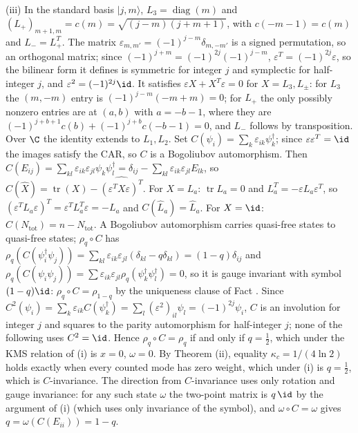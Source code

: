 (iii) In the standard basis $|j, m\rangle$, $L_{3} = \operatorname{diag}(m)$ and $(L_{+})_{m+1,m} = c(m) = \sqrt{(j - m)(j + m + 1)}$, with $c(-m-1) = c(m)$ and $L_{-} = L_{+}^{T}$. The matrix $\varepsilon_{m,m'} = (-1)^{j-m}\delta_{m,-m'}$ is a signed permutation, so an orthogonal matrix; since $(-1)^{j+m} = (-1)^{2j}(-1)^{j-m}$, $\varepsilon^{T} = (-1)^{2j}\varepsilon$, so the bilinear form it defines is symmetric for integer $j$ and symplectic for half-integer $j$, and $\varepsilon^{2} = (-1)^{2j}\id$. It satisfies $\varepsilon X + X^{T}\varepsilon = 0$ for $X = L_{3}, L_{\pm}$: for $L_{3}$ the $(m, -m)$ entry is $(-1)^{j-m}(-m + m) = 0$; for $L_{+}$ the only possibly nonzero entries are at $(a, b)$ with $a = -b - 1$, where they are $(-1)^{j+b+1}c(b) + (-1)^{j+b}c(-b-1) = 0$, and $L_{-}$ follows by transposition. Over $\C$ the identity extends to $L_{1}, L_{2}$. Set $C(\psi_{i}) = \sum_{k}\varepsilon_{ik}\psi_{k}^{\dagger}$; since $\varepsilon\varepsilon^{T} = \id$ the images satisfy the CAR, so $C$ is a Bogoliubov automorphism. Then $C(E_{ij}) = \sum_{kl}\varepsilon_{ik}\varepsilon_{jl}\psi_{k}\psi_{l}^{\dagger} = \delta_{ij} - \sum_{kl}\varepsilon_{ik}\varepsilon_{jl}E_{lk}$, so $C(\hat{X}) = \operatorname{tr}(X) - \widehat{(\varepsilon^{T}X\varepsilon)^{T}}$. For $X = L_{a}$: $\operatorname{tr}L_{a} = 0$ and $L_{a}^{T} = -\varepsilon L_{a}\varepsilon^{T}$, so $(\varepsilon^{T}L_{a}\varepsilon)^{T} = \varepsilon^{T}L_{a}^{T}\varepsilon = -L_{a}$ and $C(\hat{L}_{a}) = \hat{L}_{a}$. For $X = \id$: $C(N_{\mathrm{tot}}) = n - N_{\mathrm{tot}}$. A Bogoliubov automorphism carries quasi-free states to quasi-free states; $\rho_{q}\circ C$ has $\rho_{q}(C(\psi_{i}^{\dagger}\psi_{j})) = \sum_{kl}\varepsilon_{ik}\varepsilon_{jl}(\delta_{kl} - q\delta_{kl}) = (1 - q)\delta_{ij}$ and $\rho_{q}(C(\psi_{i}\psi_{j})) = \sum\varepsilon_{ik}\varepsilon_{jl}\rho_{q}(\psi_{k}^{\dagger}\psi_{l}^{\dagger}) = 0$, so it is gauge invariant with symbol $(1 - q)\id$: $\rho_{q}\circ C = \rho_{1-q}$ by the uniqueness clause of Fact . Since $C^{2}(\psi_{i}) = \sum_{k}\varepsilon_{ik}C(\psi_{k}^{\dagger}) = \sum_{l}(\varepsilon^{2})_{il}\psi_{l} = (-1)^{2j}\psi_{i}$, $C$ is an involution for integer $j$ and squares to the parity automorphism for half-integer $j$; none of the following uses $C^{2} = \id$. Hence $\rho_{q}\circ C = \rho_{q}$ if and only if $q = \tfrac12$, which under the KMS relation of (i) is $x = 0$, $\omega = 0$. By Theorem (ii), equality $\kappa_{c} = 1/(4\ln 2)$ holds exactly when every counted mode has zero weight, which under (i) is $q = \tfrac12$, which is $C$-invariance. The direction from $C$-invariance uses only rotation and gauge invariance: for any such state $\omega$ the two-point matrix is $q\,\id$ by the argument of (i) (which uses only invariance of the symbol), and $\omega\circ C = \omega$ gives $q = \omega(C(E_{ii})) = 1 - q$.


